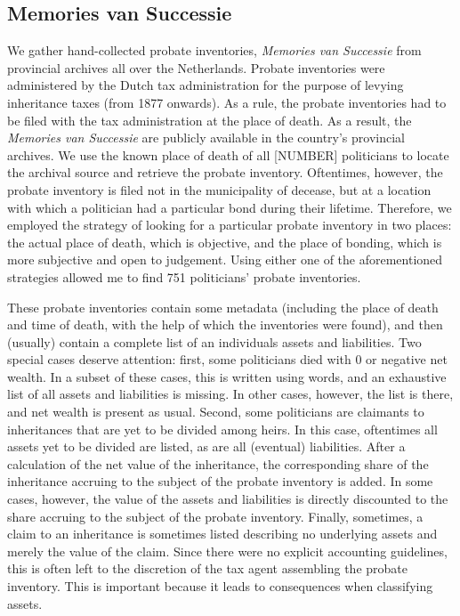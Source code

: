 \subsection{Memories van Successie}
We gather hand-collected probate inventories, \textit{Memories van Successie} from provincial archives all over the Netherlands. Probate inventories were administered by the Dutch tax administration for the purpose of levying inheritance taxes (from 1877 onwards). \autocite{bos1989memories} As a rule, the probate inventories had to be filed with the tax administration at the place of death. As a result, the \textit{Memories van Successie} are publicly available in the country's provincial archives. We use the known place of death of all [NUMBER] politicians to locate the archival source and retrieve the probate inventory. Oftentimes, however, the probate inventory is filed not in the municipality of decease, but at a location with which a politician had a particular bond during their lifetime. Therefore, we employed the strategy of looking for a particular probate inventory in two places: the actual place of death, which is objective, and the place of bonding, which is more subjective and open to judgement. Using either one of the aforementioned strategies allowed me to find 751 politicians' probate inventories. 

These probate inventories contain some metadata (including the place of death and time of death, with the help of which the inventories were found), and then (usually) contain a complete list of an individuals assets and liabilities. Two special cases deserve attention: first, some politicians died with 0 or negative net wealth. In a subset of these cases, this is written using words, and an exhaustive list of all assets and liabilities is missing. In other cases, however, the list is there, and net wealth is present as usual. Second, some politicians are claimants to inheritances that are yet to be divided among heirs. In this case, oftentimes all assets yet to be divided are listed, as are all (eventual) liabilities. After a calculation of the net value of the inheritance, the corresponding share of the inheritance accruing to the subject of the probate inventory is added. In some cases, however, the value of the assets and liabilities is directly discounted to the share accruing to the subject of the probate inventory. Finally, sometimes, a claim to an inheritance is sometimes listed describing no underlying assets and merely the value of the claim. Since there were no explicit accounting guidelines, this is often left to the discretion of the tax agent assembling the probate inventory. This is important because it leads to consequences when classifying assets. 

